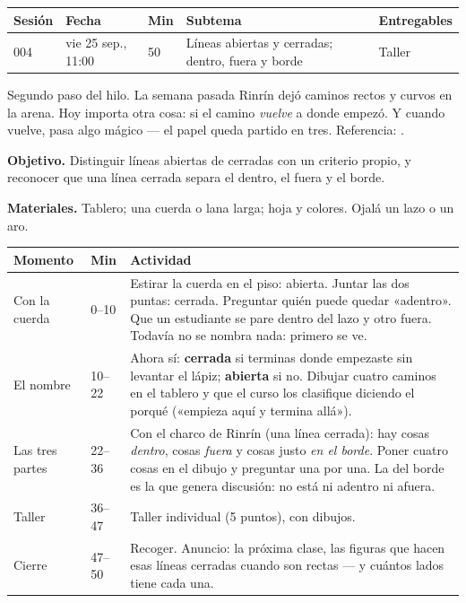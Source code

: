 \documentclass[11pt]{article}
\begin{document}
\encabezado*

\begin{center}
{\renewcommand{\arraystretch}{1.3}
\begin{tabularx}{\linewidth}{@{}l l l X l@{}}
  \toprule
  \textbf{Sesión} & \textbf{Fecha} & \textbf{Min} & \textbf{Subtema} & \textbf{Entregables}\\
  \midrule
  004 & vie 25 sep., 11:00 & 50 & Líneas abiertas y cerradas; dentro, fuera y borde & Taller\\
  \bottomrule
\end{tabularx}}
\end{center}

Segundo paso del hilo. La semana pasada Rinrín dejó caminos rectos y curvos en la arena. Hoy
importa otra cosa: si el camino \emph{vuelve} a donde empezó. Y cuando vuelve, pasa algo
mágico — el papel queda partido en tres. Referencia: .


\textbf{Objetivo.} Distinguir líneas abiertas de cerradas con un criterio propio, y reconocer
que una línea cerrada separa el dentro, el fuera y el borde.

\textbf{Materiales.} Tablero; una cuerda o lana larga; hoja y colores. Ojalá un lazo o un aro.

\begin{center}
{\renewcommand{\arraystretch}{1.3}
\begin{tabularx}{\linewidth}{@{}l l X@{}}
  \toprule
  \textbf{Momento} & \textbf{Min} & \textbf{Actividad}\\
  \midrule
  Con la cuerda & 0--10 & Estirar la cuerda en el piso: abierta. Juntar las dos puntas:
    cerrada. Preguntar quién puede quedar «adentro». Que un estudiante se pare dentro del
    lazo y otro fuera. Todavía no se nombra nada: primero se ve.\\
  El nombre & 10--22 & Ahora sí: \textbf{cerrada} si terminas donde empezaste sin levantar
    el lápiz; \textbf{abierta} si no. Dibujar cuatro caminos en el tablero y que el curso
    los clasifique diciendo el porqué («empieza aquí y termina allá»).\\
  Las tres partes & 22--36 & Con el charco de Rinrín (una línea cerrada): hay cosas
    \emph{dentro}, cosas \emph{fuera} y cosas justo \emph{en el borde}. Poner cuatro cosas
    en el dibujo y preguntar una por una. La del borde es la que genera discusión: no está
    ni adentro ni afuera.\\
  Taller & 36--47 & Taller individual (5 puntos), con dibujos.\\
  Cierre & 47--50 & Recoger. Anuncio: la próxima clase, las figuras que hacen esas líneas
    cerradas cuando son rectas — y cuántos lados tiene cada una.\\
  \bottomrule
\end{tabularx}}
\end{center}
\end{document}
